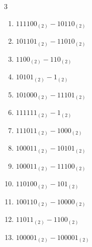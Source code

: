 \begin{multicols}{3}
\begin{enumerate}

  \item $111100_{(2)} - 10110_{(2)}$


  \item $101101_{(2)} - 11010_{(2)}$


  \item $1100_{(2)} - 110_{(2)}$


\columnbreak %

  \item $10101_{(2)} - 1_{(2)}$


  \item $101000_{(2)} - 11101_{(2)}$


  \item $111111_{(2)} - 1_{(2)}$


  \item $111011_{(2)} - 1000_{(2)}$


  \item $100011_{(2)} - 10101_{(2)}$


  \item $100011_{(2)} - 11100_{(2)}$


  \item $110100_{(2)} - 101_{(2)}$


  \item $100110_{(2)} - 10000_{(2)}$


  \item $11011_{(2)} - 1100_{(2)}$


  \item $100001_{(2)} - 100001_{(2)}$



\end{enumerate}
\end{multicols}
